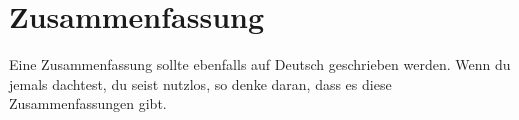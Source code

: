 \chapter{Zusammenfassung}

Eine Zusammenfassung sollte ebenfalls auf Deutsch geschrieben werden.
Wenn du jemals dachtest, du seist nutzlos, so denke daran, dass es diese Zusammenfassungen gibt.